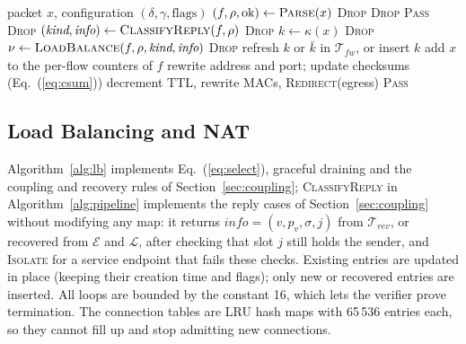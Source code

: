 \documentclass[conference]{IEEEtran}
\begin{document}
\begin{algorithm}[t]
\caption{Per-packet data-plane pipeline}
\label{alg:pipeline}
\begin{algorithmic}[1]
\REQUIRE packet $x$, configuration $(\delta,\gamma,\text{flags})$
\STATE $(f,\rho,\text{ok}) \gets \textsc{Parse}(x)$ 
  \RETURN \textsc{Drop} 
\ENDIF
{}
  \RETURN \textsc{Drop} 
\ENDIF
{}
  \RETURN \textsc{Pass} 
\ENDIF
{}
  \RETURN \textsc{Drop}
\ENDIF
\STATE $(\textit{kind}, \textit{info}) \gets \textsc{ClassifyReply}(f, \rho)$
  \RETURN \textsc{Drop}
\ENDIF
\STATE $k \gets \kappa(x)$ 
  \RETURN \textsc{Drop}
\ENDIF
\STATE $\nu \gets \textsc{LoadBalance}(f, \rho, \textit{kind}, \textit{info})$ 
  \RETURN \textsc{Drop} 
\ENDIF
{}
  \STATE refresh $k$ or $\bar k$ in $\mathcal{T}_{fw}$, or insert $k$
\ENDIF
\STATE add $x$ to the per-flow counters of $f$
  \STATE rewrite address and port; update checksums (Eq.~(\ref{eq:csum}))
\ENDIF
{}
  \STATE decrement TTL, rewrite MACs, \RETURN \textsc{Redirect}(egress)
\ENDIF
\RETURN \textsc{Pass}
\end{algorithmic}
\end{algorithm}

\subsection{Load Balancing and NAT}
Algorithm~\ref{alg:lb} implements Eq.~(\ref{eq:select}), graceful draining and
the coupling and recovery rules of Section~\ref{sec:coupling};
\textsc{ClassifyReply} in Algorithm~\ref{alg:pipeline} implements the reply
cases of Section~\ref{sec:coupling} without modifying any map: it returns
$\textit{info}=(v,p_v,\sigma,j)$ from $\mathcal{T}_{rev}$, or recovered from
$\mathcal{E}$ and $\mathcal{L}$, after checking that slot $j$ still holds the
sender, and \textsc{Isolate} for a service endpoint that fails these checks.
Existing entries are updated in place (keeping their creation time and
flags); only new or recovered entries are inserted. All loops are bounded by the
constant 16, which lets the verifier prove termination. The connection tables
are LRU hash maps with 65\,536 entries each, so they cannot fill up and stop
admitting new connections.
\end{document}
